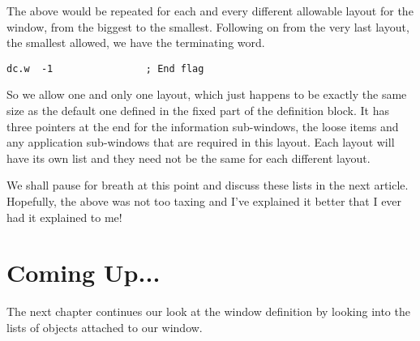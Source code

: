 The above would be repeated for each and every different allowable
    layout for the window, from the biggest to the smallest. Following on from the very last layout, the smallest allowed, we have the terminating word.

\begin{lstlisting}[firstnumber=last,caption={Main Window - Repeating Part - End Flag}]
           dc.w  -1                ; End flag
\end{lstlisting}

So we allow one and only one layout, which just happens to be
    exactly the same size as the default one defined in the fixed part of the
    definition block. It has three pointers at the end for the information
    sub-{}windows, the loose items and any application sub-{}windows that are
    required in this layout. Each layout will have its own list and they need
    not be the same for each different layout.

We shall pause for breath at this point and discuss these lists in
    the next article. Hopefully, the above was not too taxing and I've
    explained it better that I ever had it explained to me!

\section{Coming Up...}
\label{ch22-the-end}%

The next chapter continues our look at the window definition by looking
    into the lists of objects attached to our window.


